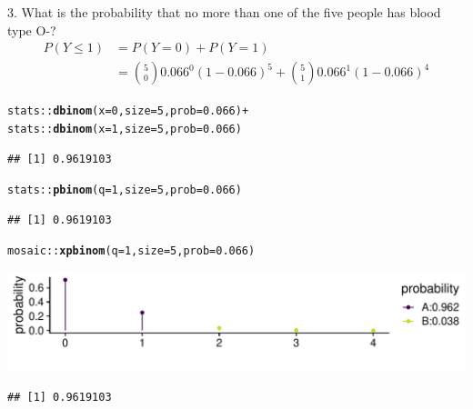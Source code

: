 \documentclass[10pt,handout]{beamer}\usepackage[]{graphicx}\usepackage[]{color}
\makeatletter
\def\maxwidth{ %
  \ifdim\Gin@nat@width>\linewidth
    \linewidth
  \else
    \Gin@nat@width
  \fi
}
\newcommand{\hlnum}[1]{\textcolor[rgb]{0.686,0.059,0.569}{#1}}%
\newcommand{\hlopt}[1]{\textcolor[rgb]{0,0,0}{#1}}%
\newcommand{\hlstd}[1]{\textcolor[rgb]{0.345,0.345,0.345}{#1}}%
\newcommand{\hlkwc}[1]{\textcolor[rgb]{0.333,0.667,0.333}{#1}}%
\newcommand{\hlkwd}[1]{\textcolor[rgb]{0.737,0.353,0.396}{\textbf{#1}}}%
\newenvironment{kframe}{%
 \def\at@end@of@kframe{}%
 \ifinner\ifhmode%
  \def\at@end@of@kframe{\end{minipage}}%
  \begin{minipage}{\columnwidth}%
 \fi\fi%
 \def\FrameCommand##1{\hskip\@totalleftmargin \hskip-\fboxsep
 \colorbox{shadecolor}{##1}\hskip-\fboxsep
     \hskip-\linewidth \hskip-\@totalleftmargin \hskip\columnwidth}%
 \MakeFramed {\advance\hsize-\width
   \@totalleftmargin\z@ \linewidth\hsize
   \@setminipage}}%
 {\par\unskip\endMakeFramed%
 \at@end@of@kframe}
\newenvironment{knitrout}{}{} %
\makeatother
\begin{document}
\begin{frame}[fragile]{3. What is the probability that no more than one of the five people has blood type O-?}
	\footnotesize
	\begin{align*}
	P(Y \leq 1) & = P(Y = 0) + P(Y = 1) \\
	& = \binom{5}{0} 0.066^0 (1- 0.066)^5 + \binom{5}{1} 0.066^1 (1- 0.066)^4
	\end{align*}
	
	
\begin{knitrout}\tiny
{}\color{fgcolor}\begin{kframe}
\begin{alltt}
\hlstd{stats}\hlopt{::}\hlkwd{dbinom}\hlstd{(}\hlkwc{x} \hlstd{=} \hlnum{0}\hlstd{,} \hlkwc{size} \hlstd{=} \hlnum{5}\hlstd{,} \hlkwc{prob} \hlstd{=} \hlnum{0.066}\hlstd{)} \hlopt{+}
\hlstd{stats}\hlopt{::}\hlkwd{dbinom}\hlstd{(}\hlkwc{x} \hlstd{=} \hlnum{1}\hlstd{,} \hlkwc{size} \hlstd{=} \hlnum{5}\hlstd{,} \hlkwc{prob} \hlstd{=} \hlnum{0.066}\hlstd{)}
\end{alltt}
\begin{verbatim}
## [1] 0.9619103
\end{verbatim}
\begin{alltt}
\hlstd{stats}\hlopt{::}\hlkwd{pbinom}\hlstd{(}\hlkwc{q} \hlstd{=} \hlnum{1}\hlstd{,} \hlkwc{size} \hlstd{=} \hlnum{5}\hlstd{,} \hlkwc{prob} \hlstd{=} \hlnum{0.066}\hlstd{)}
\end{alltt}
\begin{verbatim}
## [1] 0.9619103
\end{verbatim}
\begin{alltt}
\hlstd{mosaic}\hlopt{::}\hlkwd{xpbinom}\hlstd{(}\hlkwc{q} \hlstd{=} \hlnum{1}\hlstd{,} \hlkwc{size} \hlstd{=} \hlnum{5}\hlstd{,} \hlkwc{prob} \hlstd{=} \hlnum{0.066}\hlstd{)}
\end{alltt}
\end{kframe}

{\centering \includegraphics[width=\maxwidth]{figure/unnamed-chunk-12-1} 

}


\begin{kframe}\begin{verbatim}
## [1] 0.9619103
\end{verbatim}
\end{kframe}
\end{knitrout}
	
\end{frame}
\end{document}

